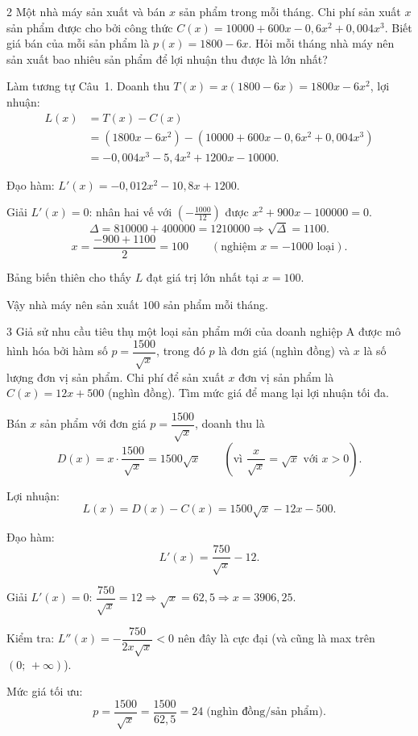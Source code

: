 \separator

\begin{baitoan}{2 \hfill {}}
Một nhà máy sản xuất và bán $x$ sản phẩm trong mỗi tháng. Chi phí sản xuất $x$ sản phẩm được cho bởi công thức $C(x) = 10000 + 600x - 0{,}6x^2 + 0{,}004x^3$. Biết giá bán của mỗi sản phẩm là $p(x) = 1800 - 6x$. Hỏi mỗi tháng nhà máy nên sản xuất bao nhiêu sản phẩm để lợi nhuận thu được là lớn nhất?
\end{baitoan}

\begin{loigiai}
Làm tương tự Câu~1. Doanh thu $T(x) = x(1800 - 6x) = 1800x - 6x^2$, lợi nhuận:
\begin{align*}
L(x) &= T(x) - C(x) \\
      &= (1800x - 6x^2) - (10000 + 600x - 0{,}6x^2 + 0{,}004x^3) \\
      &= -0{,}004x^3 - 5{,}4x^2 + 1200x - 10000.
\end{align*}

Đạo hàm: $L'(x) = -0{,}012x^2 - 10{,}8x + 1200$.

Giải $L'(x) = 0$: nhân hai vế với $\left(-\frac{1000}{12}\right)$ được $x^2 + 900x - 100000 = 0$.
\[ \Delta = 810000 + 400000 = 1210000 \Rightarrow \sqrt{\Delta} = 1100. \]
\[ x = \frac{-900 + 1100}{2} = 100 \qquad (\text{nghiệm } x = -1000 \text{ loại}). \]


Bảng biến thiên cho thấy $L$ đạt giá trị lớn nhất tại $x = 100$.

Vậy nhà máy nên sản xuất $\boxed{100}$ sản phẩm mỗi tháng.
\end{loigiai}

\separator

\begin{baitoan}{3 \hfill {}}
Giả sử nhu cầu tiêu thụ một loại sản phẩm mới của doanh nghiệp A được mô hình hóa bởi hàm số $p = \dfrac{1500}{\sqrt{x}}$, trong đó $p$ là đơn giá (nghìn đồng) và $x$ là số lượng đơn vị sản phẩm. Chi phí để sản xuất $x$ đơn vị sản phẩm là $C(x) = 12x + 500$ (nghìn đồng). Tìm mức giá để mang lại lợi nhuận tối đa.
\end{baitoan}

\begin{loigiai}
Bán $x$ sản phẩm với đơn giá $p = \dfrac{1500}{\sqrt{x}}$, doanh thu là
\[ D(x) = x \cdot \frac{1500}{\sqrt{x}} = 1500\sqrt{x} \qquad \left(\text{vì }\frac{x}{\sqrt{x}} = \sqrt{x}\text{ với }x > 0\right). \]

Lợi nhuận:
\[ L(x) = D(x) - C(x) = 1500\sqrt{x} - 12x - 500. \]

Đạo hàm:
\[ L'(x) = \frac{750}{\sqrt{x}} - 12. \]

Giải $L'(x) = 0$: $\dfrac{750}{\sqrt{x}} = 12 \Rightarrow \sqrt{x} = 62{,}5 \Rightarrow x = 3906{,}25$.

Kiểm tra: $L''(x) = -\dfrac{750}{2x\sqrt{x}} < 0$ nên đây là cực đại (và cũng là max trên $(0;\,+\infty)$).

Mức giá tối ưu:
\[ p = \frac{1500}{\sqrt{x}} = \frac{1500}{62{,}5} = \boxed{24} \;\text{(nghìn đồng/sản phẩm)}. \]
\end{loigiai}

